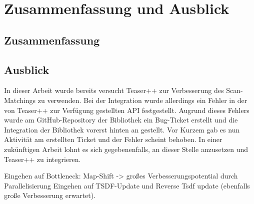 \chapter{Zusammenfassung und Ausblick}
\label{chapter:ausblick}

\section{Zusammenfassung}


\section{Ausblick}

In dieser Arbeit wurde bereits versucht Teaser++ zur Verbesserung des Scan-Matchings zu verwenden. Bei der Integration wurde allerdings ein Fehler in der von Teaser++ zur Verfügung gestellten API festgestellt. Augrund dieses Fehlers wurde am GitHub-Repository der Bibliothek ein Bug-Ticket erstellt und die Integration der Bibliothek vorerst hinten an gestellt. Vor Kurzem gab es nun Aktivität am erstellten Ticket und der Fehler scheint behoben. In einer zukünftigen Arbeit lohnt es sich gegebenenfalls, an dieser Stelle anzusetzen und Teaser++ zu integrieren.

Eingehen auf Bottleneck: Map-Shift -> großes Verbesserungspotential durch Parallelisierung
Eingehen auf TSDF-Update und Reverse Tsdf update (ebenfalls große Verbesserung erwartet).
